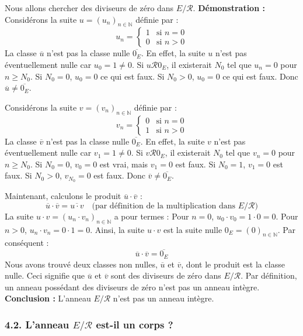 \documentclass{report}
\begin{document}
Nous allons chercher des diviseurs de zéro dans $E/\mathcal{R}$.
\textbf{Démonstration :}
Considérons la suite $u = (u_n)_{n \in \mathbb{N}}$ définie par :
$$u_n = \begin{cases} 1 & \text{si } n=0 \\ 0 & \text{si } n > 0 \end{cases}$$
La classe $\overline{u}$ n'est pas la classe nulle $\overline{0_E}$. En effet, la suite $u$ n'est pas éventuellement nulle car $u_0 = 1 \neq 0$. Si $u \mathcal{R} 0_E$, il existerait $N_0$ tel que $u_n=0$ pour $n \ge N_0$. Si $N_0=0$, $u_0=0$ ce qui est faux. Si $N_0>0$, $u_0=0$ ce qui est faux.
Donc $\overline{u} \neq \overline{0_E}$.

Considérons la suite $v = (v_n)_{n \in \mathbb{N}}$ définie par :
$$v_n = \begin{cases} 0 & \text{si } n=0 \\ 1 & \text{si } n > 0 \end{cases}$$
La classe $\overline{v}$ n'est pas la classe nulle $\overline{0_E}$. En effet, la suite $v$ n'est pas éventuellement nulle car $v_1 = 1 \neq 0$. Si $v \mathcal{R} 0_E$, il existerait $N_0$ tel que $v_n=0$ pour $n \ge N_0$. Si $N_0=0$, $v_0=0$ est vrai, mais $v_1=0$ est faux. Si $N_0=1$, $v_1=0$ est faux. Si $N_0>0$, $v_{N_0}=0$ est faux.
Donc $\overline{v} \neq \overline{0_E}$.

Maintenant, calculons le produit $\overline{u} \cdot \overline{v}$ :
$$\overline{u} \cdot \overline{v} = \overline{u \cdot v} \quad \text{(par définition de la multiplication dans } E/\mathcal{R})$$
La suite $u \cdot v = (u_n \cdot v_n)_{n \in \mathbb{N}}$ a pour termes :
Pour $n=0$, $u_0 \cdot v_0 = 1 \cdot 0 = 0$.
Pour $n > 0$, $u_n \cdot v_n = 0 \cdot 1 = 0$.
Ainsi, la suite $u \cdot v$ est la suite nulle $0_E = (0)_{n \in \mathbb{N}}$.
Par conséquent :
$$\overline{u} \cdot \overline{v} = \overline{0_E}$$
Nous avons trouvé deux classes non nulles, $\overline{u}$ et $\overline{v}$, dont le produit est la classe nulle.
Ceci signifie que $\overline{u}$ et $\overline{v}$ sont des diviseurs de zéro dans $E/\mathcal{R}$.
Par définition, un anneau possédant des diviseurs de zéro n'est pas un anneau intègre.
\textbf{Conclusion :} L'anneau $E/\mathcal{R}$ n'est pas un anneau intègre.

\subsubsection*{4.2. L'anneau $E/\mathcal{R}$ est-il un corps ?}
\end{document}
